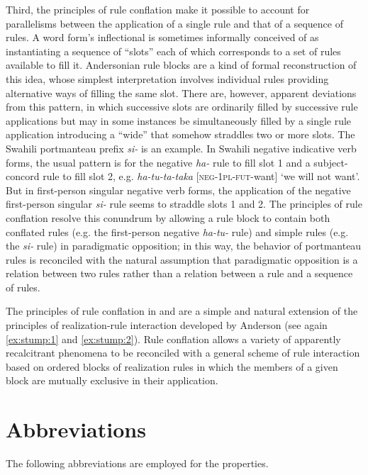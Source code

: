 \documentclass[output=paper,
modfonts
]{LSP/langsci}
\begin{document}
Third, the principles of rule conflation make it possible to account for  parallelisms between the application of a single rule and that of a sequence of rules.  A word form’s inflectional  is sometimes informally conceived of as instantiating a sequence of “slots” each of which corresponds to a set of rules available to fill it.  Andersonian rule blocks are a kind of formal reconstruction of this idea, whose simplest interpretation involves individual rules providing alternative ways of filling the same slot.  There are, however, apparent deviations from this pattern, in which successive slots are ordinarily filled by successive rule applications but may in some instances be simultaneously filled by a single rule application introducing a “wide”  that somehow straddles two or more slots. The Swahili portmanteau prefix \textit{si\nobreakdash-} is an example.  In Swahili negative indicative verb forms,  the usual pattern is for the negative \textit{ha\nobreakdash-} rule to fill slot 1 and a subject\nobreakdash-concord rule to fill slot 2, e.g. \textit{ha\nobreakdash-tu\nobreakdash-ta\nobreakdash-taka} [\textsc{neg\nobreakdash-1pl\nobreakdash-fut\nobreakdash-}want] ‘we will not want’.  But in first\nobreakdash-person singular negative verb forms, the application of the negative first\nobreakdash-person singular \textit{si\nobreakdash-} rule seems to straddle slots 1 and 2.  The principles of rule conflation resolve this conundrum by allowing a rule block to contain both conflated rules (e.g. the first\nobreakdash-person  negative \textit{ha\nobreakdash-tu\nobreakdash-} rule) and simple rules (e.g. the \textit{si\nobreakdash-} rule) in paradigmatic opposition; in this way, the behavior of portmanteau rules is reconciled with the natural assumption that paradigmatic opposition is a relation between two rules rather than a relation between a rule and a sequence of rules. 

The principles of rule conflation in  and  are a simple and natural extension of the principles of realization-rule interaction developed by Anderson (see again \ref{ex:stump:1} and \ref{ex:stump:2}).  Rule conflation allows a variety of apparently recalcitrant phenomena to be reconciled with a general scheme of rule interaction based on ordered blocks of realization rules in which the members of a given block are mutually exclusive in their application.  

\section*{Abbreviations}
The following abbreviations are employed for the  properties.  
\end{document}
